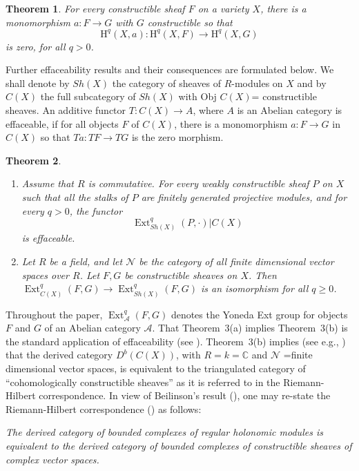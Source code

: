 \documentclass[10pt,twoside]{article}
\newtheorem{thm*}{Theorem}
\newcommand{\homology}{{\mathrm {H}}}
\newcommand{\C}{{\mathbb {C}}}
\newcommand{\Ext}{{\operatorname{Ext}}}
\begin{document}
\begin{thm*} For every constructible sheaf $F$ on a variety
$X$, there is a monomorphism $a:F\to G$ with $G$ constructible  so that 
$$
\homology^q(X,a):\homology^q(X,F) \to \homology^q(X,G)
$$ 
is zero, for all $q>0$.
\end{thm*}
 
Further effaceability results and their consequences are
formulated below.  We shall denote by $Sh(X)$ the category of sheaves of 
$R$-modules on $X$ and by $C(X)$ the full subcategory of $Sh(X)$ with 
Obj $C(X)$= constructible sheaves. 
An additive functor $T:C(X)\to A$, where $A$ is an Abelian category
is effaceable, if for all objects $F$ of $C(X)$, there is a 
monomorphism $a:F\to G$ in $C(X)$ so that $Ta:TF\to TG$ is
the zero morphism.  

\begin{thm*} \begin{enumerate}
\item[{\rm (a)}] Assume that $R$ is commutative.   
For every weakly constructible sheaf 
$P$ on $X$ such that all the stalks of $P$ are finitely
generated projective modules, and for every $q>0$, 
the functor 
$$
\Ext_{Sh(X)}^q(P, \cdot)|C(X)
$$ 
is effaceable. 
\item[{\rm (b)}] Let $R$ be a field, and let $\mathcal{N}$  be the
category of all finite dimensional vector spaces over $R$.
 Let $F,G$ be constructible sheaves on $X$. Then 
 $\Ext^q_{C(X)}(F,G) \to \Ext^q_{Sh(X)}(F,G)$ is an 
isomorphism for all $q \geq 0$.
\end{enumerate}
\end{thm*}

Throughout the paper, $\Ext^q_{\mathcal{A}}(F,G)$ denotes the Yoneda Ext group 
for objects $F$ and $G$ of an Abelian category $\mathcal{A}$.
That Theorem~3(a) implies Theorem~3(b) is the
standard application of effaceability (see 
\cite[Prop.~2.2.1,~page~141]{nori:Toh} ). Theorem~3(b) implies (see e.g., 
\cite[Lemma~1.4]{nori:Be2})
that the derived category $D^b(C(X))$, with $R=k=\C$ and $\mathcal{N}$
=finite dimensional vector spaces, is equivalent to the triangulated 
category of ``cohomologically constructible sheaves'' 
as it is referred to in
the Riemann-Hilbert correspondence.  In view of Beilinson's
result (\cite[Main~theorem~1.3,~page~29]{nori:Be2}), one may re-state
the Riemann-Hilbert correspondence (\cite[Thm.~14.4]{nori:Bo}) as follows:

\medskip
 
\emph{The derived category of bounded complexes of regular holonomic modules 
is equivalent to the derived category of bounded complexes of
constructible sheaves of complex vector spaces.}
\end{document}

